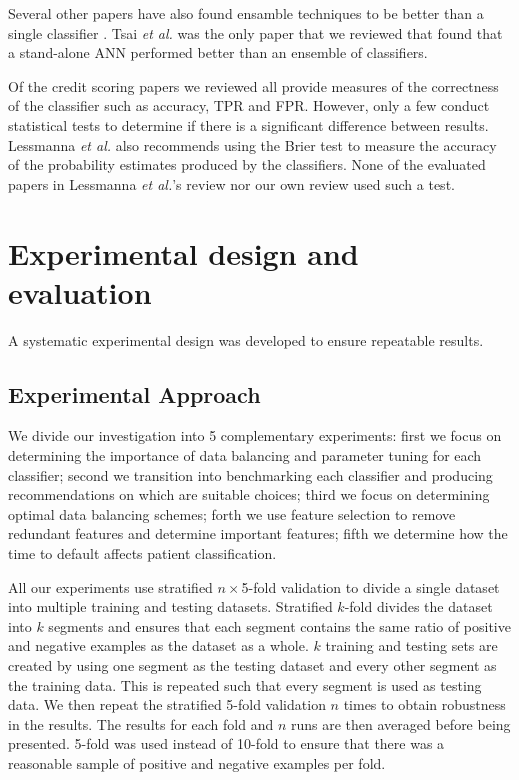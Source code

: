 \documentclass{sig-alternate-05-2015}
\begin{document}
	Several other papers have also found ensamble techniques to be better than a single classifier \cite{Hsieh2010534, Nanni20093028, Twala20103326, Wang2011223}. Tsai \textit{et al.} \cite{Tsai20082639} was the only paper that we reviewed that found that a stand-alone ANN performed better than an ensemble of classifiers.
	
	Of the credit scoring papers we reviewed \cite{Abdou2016, Angelini2008733, Bekhet201420, Danenas20153194, Desai199624, Hsieh2010534, Huang2004543, Huang2007847, Lee2002245, Li2006772, Luo20097562, Malhotra200383, Nanni20093028, Tsai20082639, Twala20103326, Wang2011223} all provide measures of the correctness of the classifier such as accuracy, TPR and FPR. However, only a few \cite{Desai199624, Huang2004543, Malhotra200383, Wang2011223} conduct statistical tests to determine if there is a significant difference between results. Lessmanna \textit{et al.} also recommends using the Brier test to measure the accuracy of the probability estimates produced by the classifiers. None of the evaluated papers in Lessmanna \textit{et al.}'s review nor our own review used such a test.
	
	\section{Experimental design and evaluation}
	A systematic experimental design was developed to ensure repeatable results.
	\subsection{Experimental Approach}
	\label{method-approach}
	We divide our investigation into 5 complementary experiments: first we focus on determining the importance of data balancing and parameter tuning for each classifier; second we transition into benchmarking each classifier and producing recommendations on which are suitable choices; third  we focus on determining optimal data balancing schemes; forth we use feature selection to remove redundant features and determine important features; fifth we determine how the time to default affects patient classification.
	
	All our experiments use stratified $n\times$5-fold validation to divide a single dataset into multiple training and testing datasets. Stratified $k$-fold divides the dataset into $k$ segments and ensures that each segment contains the same ratio of positive and negative examples as the dataset as a whole. $k$ training and testing sets are created by using one segment as the testing dataset and every other segment as the training data. This is repeated such that every segment is used as testing data. We then repeat the stratified 5-fold validation $n$ times to obtain robustness in the results. The results for each fold and $n$ runs are then averaged before being presented. 5-fold was used instead of 10-fold to ensure that there was a reasonable sample of positive and negative examples per fold.
	
\end{document}

